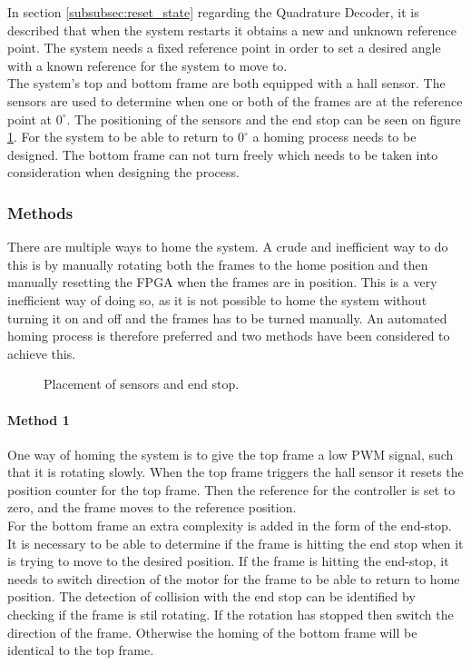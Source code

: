 \documentclass[../../../main]{subfiles}
\begin{document}
In section \ref{subsubsec:reset_state} regarding the Quadrature Decoder, it is described that when the system restarts it obtains a new and unknown reference point.
The system needs a fixed reference point in order to set a desired angle with a known reference for the system to move to. \\
The system's top and bottom frame are both equipped with a hall sensor.
The sensors are used to determine when one or both of the frames are at the reference point at $0^\circ$. The positioning of the sensors and the end stop can be seen on figure \ref{fig:homing_system}.
For the system to be able to return to $0^\circ$ a homing process needs to be designed.
The bottom frame can not turn freely which needs to be taken into consideration when designing the process.
\subsubsection{Methods}
There are multiple ways to home the system. A crude and inefficient way to do this is by manually rotating both the frames to the home position and then manually resetting the FPGA when the frames are in position.
This is a very inefficient way of doing so, as it is not possible to home the system without turning it on and off and the frames has to be turned manually.
An automated homing process is therefore preferred and two methods have been considered to achieve this.

\begin{figure}[H]
  \centering
  \def\svgwidth{\textwidth}
  
  \caption{Placement of sensors and end stop.}
  \label{fig:homing_system}
\end{figure}
\paragraph{Method 1}%
\label{par:method_1}
One way of homing the system is to give the top frame a low PWM signal, such that it is rotating slowly.
When the top frame triggers the hall sensor it resets the position counter for the top frame.
Then the reference for the controller is set to zero, and the frame moves to the reference position.
\\
For the bottom frame an extra complexity is added in the form of the end-stop. It is necessary to be able to determine if the frame is hitting the end stop when it is trying to move to the desired position.
If the frame is hitting the end-stop, it needs to switch direction of the motor for the frame to be able to return to home position.
The detection of collision with the end stop can be identified by checking if the frame is stil rotating. If the rotation has stopped then switch the direction of the frame.
Otherwise the homing of the bottom frame will be identical to the top frame.
\end{document}
